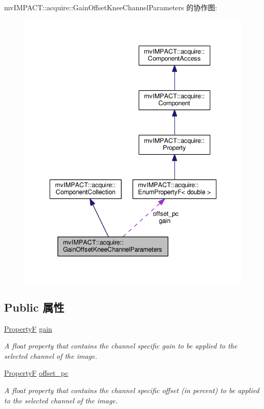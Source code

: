 mv\+I\+M\+P\+A\+C\+T\+:\+:acquire\+:\+:Gain\+Offset\+Knee\+Channel\+Parameters 的协作图\+:
\nopagebreak
\begin{figure}[H]
\begin{center}
\leavevmode
\includegraphics[width=341pt]{classmv_i_m_p_a_c_t_1_1acquire_1_1_gain_offset_knee_channel_parameters__coll__graph}
\end{center}
\end{figure}
\subsection*{Public 属性}
\begin{DoxyCompactItemize}
\item 
\hyperlink{group___common_interface_gaf54865fe5a3d5cfd15f9a111b40d09f9}{Property\+F} \hyperlink{classmv_i_m_p_a_c_t_1_1acquire_1_1_gain_offset_knee_channel_parameters_a90582e8fee2c3e3bffce3b3132573993}{gain}
\begin{DoxyCompactList}\small\item\em A float property that contains the channel specific gain to be applied to the selected channel of the image. \end{DoxyCompactList}\item 
\hyperlink{group___common_interface_gaf54865fe5a3d5cfd15f9a111b40d09f9}{Property\+F} \hyperlink{classmv_i_m_p_a_c_t_1_1acquire_1_1_gain_offset_knee_channel_parameters_a6f4020ed712536bb048f7126944e47d1}{offset\+\_\+pc}
\begin{DoxyCompactList}\small\item\em A float property that contains the channel specific offset (in percent) to be applied to the selected channel of the image. \end{DoxyCompactList}\end{DoxyCompactItemize}
